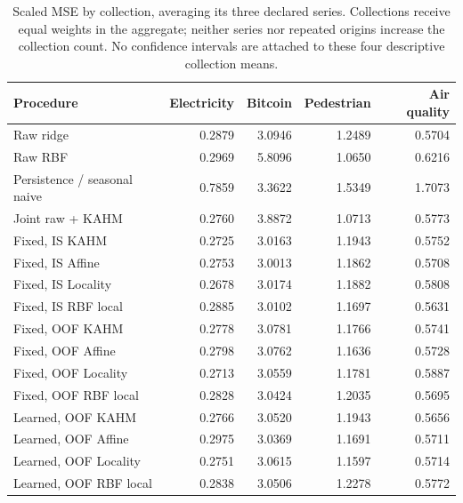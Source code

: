 \begin{table}[!htbp]
\centering\small\setlength{\tabcolsep}{4pt}
\caption{Scaled MSE by collection, averaging its three declared series. Collections receive equal weights in the aggregate; neither series nor repeated origins increase the collection count. No confidence intervals are attached to these four descriptive collection means.}
\label{tab:target-archive-sources}
\begin{tabular}{lrrrr}
\toprule
Procedure & Electricity & Bitcoin & Pedestrian & Air quality \\
\midrule
Raw ridge & 0.2879 & 3.0946 & 1.2489 & 0.5704 \\
Raw RBF & 0.2969 & 5.8096 & 1.0650 & 0.6216 \\
Persistence / seasonal naive & 0.7859 & 3.3622 & 1.5349 & 1.7073 \\
Joint raw + KAHM & 0.2760 & 3.8872 & 1.0713 & 0.5773 \\
Fixed, IS KAHM & 0.2725 & 3.0163 & 1.1943 & 0.5752 \\
Fixed, IS Affine & 0.2753 & 3.0013 & 1.1862 & 0.5708 \\
Fixed, IS Locality & 0.2678 & 3.0174 & 1.1882 & 0.5808 \\
Fixed, IS RBF local & 0.2885 & 3.0102 & 1.1697 & 0.5631 \\
Fixed, OOF KAHM & 0.2778 & 3.0781 & 1.1766 & 0.5741 \\
Fixed, OOF Affine & 0.2798 & 3.0762 & 1.1636 & 0.5728 \\
Fixed, OOF Locality & 0.2713 & 3.0559 & 1.1781 & 0.5887 \\
Fixed, OOF RBF local & 0.2828 & 3.0424 & 1.2035 & 0.5695 \\
Learned, OOF KAHM & 0.2766 & 3.0520 & 1.1943 & 0.5656 \\
Learned, OOF Affine & 0.2975 & 3.0369 & 1.1691 & 0.5711 \\
Learned, OOF Locality & 0.2751 & 3.0615 & 1.1597 & 0.5714 \\
Learned, OOF RBF local & 0.2838 & 3.0506 & 1.2278 & 0.5772 \\
\bottomrule
\end{tabular}
\end{table}
